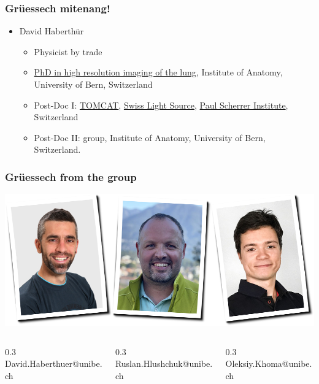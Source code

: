 

\begin{frame}
	\maketitle
\end{frame}

\begin{frame}
	\frametitle{Grüessech mitenang!}
	\begin{itemize}
		\item David Haberthür
		\begin{itemize}
			\item Physicist by trade
			\item \href{https://boris.unibe.ch/2619/}{PhD in high resolution imaging of the lung}, Institute of Anatomy, University of Bern, Switzerland
			\item Post-Doc I: \href{https://www.psi.ch/sls/tomcat/}{TOMCAT}, \href{https://www.psi.ch/sls/}{Swiss Light Source}, \href{https://www.psi.ch/}{Paul Scherrer Institute}, Switzerland
			\item Post-Doc II: \uct group, Institute of Anatomy, University of Bern, Switzerland.
		\end{itemize}
	\end{itemize}
\end{frame}

\begin{frame}
	\frametitle{Grüessech from the \uct group}
	\centering
	\includegraphics[width=\imagewidth]{./images/team}
		\begin{columns}
		\hfill\begin{column}{0.3\imagewidth}
			\centering%
			David{\color{ubRed}.}Haberthuer{\color{ubRed}@unibe.ch}%
		\end{column}
		\begin{column}{0.3\imagewidth}
			\centering%
			Ruslan{\color{ubRed}.}Hlushchuk{\color{ubRed}@unibe.ch}%
		\end{column}
		\begin{column}{0.3\imagewidth}
			\centering%
			Oleksiy{\color{ubRed}.}Khoma{\color{ubRed}@unibe.ch}%
		\end{column}\hfill%
	\end{columns}
\end{frame}

